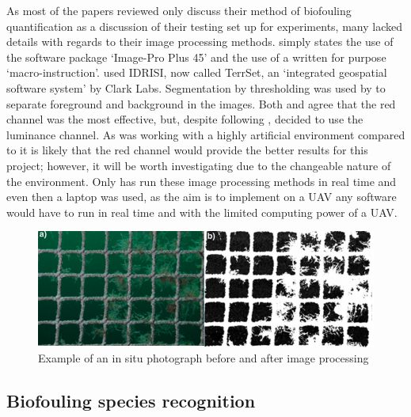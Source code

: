 \documentclass[11.5pt, twoside, a4paper]{article}
\begin{document}
As most of the papers reviewed only discuss their method of biofouling quantification as a discussion of their testing set up for experiments, many lacked details with regards to their image processing methods. \cite{braithwaite2007biofouling} simply states the use of the software package `Image-Pro Plus 45' and the use of a written for purpose `macro-instruction'. \cite{hodson1995situ} used IDRISI, now called TerrSet, an `integrated geospatial software system' \cite{TerrSet} by Clark Labs. Segmentation by thresholding was used by \cite{guenther2010development,gansel2015drag,jakobsen2011automatic} to separate foreground and background in the images. Both \cite{guenther2010development} and \cite{jakobsen2011automatic} agree that the red channel was the most effective, but, despite following \cite{guenther2010development}, \cite{gansel2015drag} decided to use the luminance channel. As \cite{gansel2015drag} was working with a highly artificial environment compared to \cite{guenther2010development,jakobsen2011automatic} it is likely that the red channel would provide the better results for this project; however, it will be worth investigating due to the changeable nature of the environment. Only \cite{jakobsen2011automatic} has run these image processing methods in real time and even then a laptop was used, as the aim is to implement on a UAV any software would have to run in real time and with the limited computing power of a UAV.

\begin{figure}
\includegraphics[width=\linewidth]{FoulingNet.png}
\caption{Example of an in situ photograph before and after image processing \cite{guenther2010development} \label{fig:foulingnet}}
\end{figure}


\subsection{Biofouling species recognition}
\end{document}
